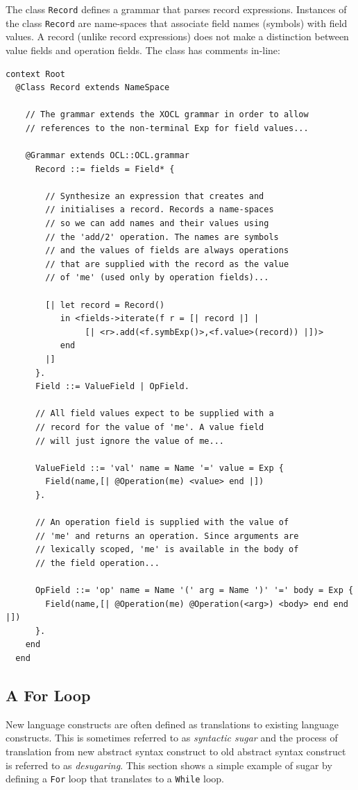 \documentclass{article}
\begin{document}
The class {\tt Record} defines a grammar that parses record expressions. Instances
of the class {\tt Record} are name-spaces that associate field names (symbols)
with field values. A record (unlike record expressions) does not make a distinction
between value fields and operation fields. The class has comments in-line:
\begin{verbatim}
context Root
  @Class Record extends NameSpace
  
    // The grammar extends the XOCL grammar in order to allow
    // references to the non-terminal Exp for field values...
    
    @Grammar extends OCL::OCL.grammar
      Record ::= fields = Field* {
      
        // Synthesize an expression that creates and 
        // initialises a record. Records a name-spaces
        // so we can add names and their values using
        // the 'add/2' operation. The names are symbols
        // and the values of fields are always operations
        // that are supplied with the record as the value
        // of 'me' (used only by operation fields)...
        
        [| let record = Record()
           in <fields->iterate(f r = [| record |] |
                [| <r>.add(<f.symbExp()>,<f.value>(record)) |])>
           end
        |]
      }.
      Field ::= ValueField | OpField.
      
      // All field values expect to be supplied with a 
      // record for the value of 'me'. A value field
      // will just ignore the value of me...
      
      ValueField ::= 'val' name = Name '=' value = Exp { 
        Field(name,[| @Operation(me) <value> end |]) 
      }.
      
      // An operation field is supplied with the value of
      // 'me' and returns an operation. Since arguments are
      // lexically scoped, 'me' is available in the body of
      // the field operation...
      
      OpField ::= 'op' name = Name '(' arg = Name ')' '=' body = Exp { 
        Field(name,[| @Operation(me) @Operation(<arg>) <body> end end |]) 
      }.
    end
  end
\end{verbatim}

\subsection{A For Loop}

New language constructs are often defined as translations to existing language constructs.
This is sometimes referred to as {\em syntactic sugar} and the process of translation
from new abstract syntax construct to old abstract syntax construct is referred to
as {\em desugaring}. This section shows a simple example of sugar by defining a {\tt For}
loop that translates to a {\tt While} loop.
\end{document}
